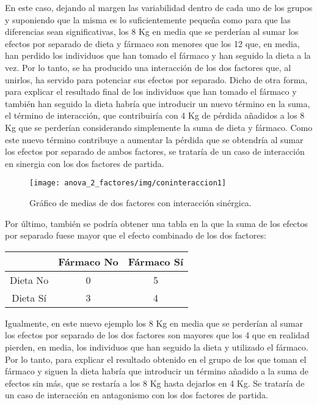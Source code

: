 En este caso, dejando al margen las variabilidad dentro de cada uno de los grupos y suponiendo que la misma es lo suficientemente pequeña
como para que las diferencias sean significativas, los 8 Kg en media que se perderían al sumar los efectos por separado de dieta y fármaco
son menores que los 12 que, en media, han perdido los individuos que han tomado el fármaco y han seguido la dieta a la vez. Por lo tanto, se
ha producido una interacción de los dos factores que, al unirlos, ha servido para potenciar sus efectos por separado. Dicho de otra forma,
para explicar el resultado final de los individuos que han tomado el fármaco y también han seguido la dieta habría que introducir un nuevo
término en la suma, el término de interacción, que contribuiría con 4 Kg de pérdida añadidos a los 8 Kg que se perderían considerando
simplemente la suma de dieta y fármaco. Como este nuevo término contribuye a aumentar la pérdida que se obtendría al sumar los efectos por
separado de ambos factores, se trataría de un caso de interacción en sinergia con los dos factores de partida.

\begin{figure}[h!]
\begin{center}
\texttt{[image: anova\_2\_factores/img/coninteraccion1]}
\caption{Gráfico de medias de dos factores con interacción sinérgica.}
\end{center}
\end{figure}

Por último, también se podría obtener una tabla en la que la suma de los efectos por separado fuese mayor que el efecto combinado de los dos
factores:

\begin{center}
\begin{tabular}{|l|l|l|}
\cline{2-3}
\multicolumn{1}{c|}{} & \multicolumn{1}{c|}{Fármaco No} & \multicolumn{1}{c|}{Fármaco Sí} \\
\hline
\multicolumn{1}{|c|}{Dieta No} & \multicolumn{1}{c|}{0} & \multicolumn{1}{c|}{5} \\
\hline
\multicolumn{1}{|c|}{Dieta Sí} & \multicolumn{1}{c|}{3} & \multicolumn{1}{c|}{4} \\
\hline
\end{tabular}
\end{center}

Igualmente, en este nuevo ejemplo los 8 Kg en media que se perderían al sumar los efectos por separado de los dos factores son mayores que
los 4 que en realidad pierden, en media, los individuos que han seguido la dieta y utilizado el fármaco. Por lo tanto, para explicar el
resultado obtenido en el grupo de los que toman el fármaco y siguen la dieta habría que introducir un término añadido a la suma de efectos
sin más, que se restaría a los 8 Kg hasta dejarlos en 4 Kg. Se trataría de un caso de interacción en antagonismo con los dos factores de
partida.

